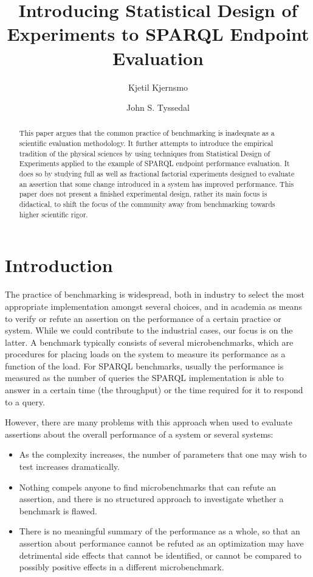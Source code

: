 \documentclass{llncs}
\title{Introducing Statistical Design of Experiments to SPARQL
  Endpoint Evaluation}
\author{Kjetil Kjernsmo\inst{1} \and John S. Tyssedal\inst{2}}
\institute{Department of Informatics,
Postboks 1080 Blindern,
N-0316 Oslo, Norway \email{kjekje@ifi.uio.no} \and Department of Mathematical Sciences,
Norwegian University of Science and Technology,
N-7491 Trondheim,
Norway
\email{john.tyssedal@math.ntnu.no}}
\begin{document}
\maketitle

\begin{abstract}
This paper argues that the common practice of benchmarking is
inadequate as a scientific evaluation methodology. It further attempts
to introduce the empirical tradition of the physical sciences by using
techniques from Statistical Design of Experiments applied to the
example of SPARQL endpoint performance evaluation. It does so by
studying full as well as fractional factorial experiments designed to
evaluate an assertion that some change introduced in a system has
improved performance. This paper does not present a finished
experimental design, rather its main focus is didactical, to shift the
focus of the community away from benchmarking towards higher
scientific rigor.
\end{abstract}

\section{Introduction}

The practice of benchmarking is widespread, both in industry to select
the most appropriate implementation amongst several choices, and in
academia as means to verify or refute an assertion on the performance
of a certain practice or system. While we could contribute to the
industrial cases, our focus is on the latter. A benchmark typically
consists of several microbenchmarks, which are procedures for placing
loads on the system to measure its performance as a function of the
load. For SPARQL benchmarks, usually the performance is measured as
the number of queries the SPARQL implementation is able to answer in a
certain time (the throughput) or the time required for it to respond
to a query.

However, there are many problems with this approach when used to
evaluate assertions about the overall performance of a system or
several systems:
\begin{itemize}
\item As the complexity increases, the number of parameters that one
  may wish to test increases dramatically.
\item Nothing compels anyone to find microbenchmarks that can refute
  an assertion, and there is no structured approach to investigate
  whether a benchmark is flawed.
\item There is no meaningful summary of the performance as a whole, so
  that an assertion about performance cannot be refuted as an
  optimization may have detrimental side effects that cannot be
  identified, or cannot be compared to possibly positive effects in a
  different microbenchmark.
\end{itemize}
\end{document}
